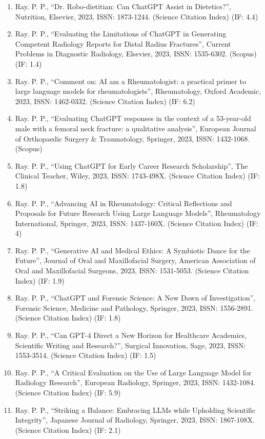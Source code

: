 \documentclass[11pt,a4paper]{moderncv}
\begin{document}
\begin{adjustwidth}{6em}{0pt}
\begin{enumerate}
		\item Ray. P. P., “Dr. Robo-dietitian: Can ChatGPT Assist in Dietetics?”, Nutrition, Elsevier, 2023, ISSN: 1873-1244. (Science Citation Index) (IF: 4.4)
		\item Ray. P. P., “Evaluating the Limitations of ChatGPT in Generating Competent Radiology Reports for Distal Radius Fractures”, Current Problems in Diagnostic Radiology, Elsevier, 2023, ISSN: 1535-6302. (Scopus) (IF: 1.4)
		\item Ray. P. P., “Comment on: AI am a Rheumatologist: a practical primer to large language models for rheumatologists”, Rheumatology, Oxford Academic, 2023, ISSN: 1462-0332. (Science Citation Index) (IF: 6.2)
		\item Ray. P. P., “Evaluating ChatGPT responses in the context of a 53-year-old male with a femoral neck fracture: a qualitative analysis”, European Journal of Orthopaedic Surgery \& Traumatology, Springer, 2023, ISSN: 1432-1068. (Scopus)
		\item Ray. P. P., “Using ChatGPT for Early Career Research Scholarship”, The Clinical Teacher, Wiley, 2023, ISSN: 1743-498X. (Science Citation Index) (IF: 1.8)
		\item Ray. P. P., “Advancing AI in Rheumatology: Critical Reflections and Proposals for Future Research Using Large Language Models”, Rheumatology International, Springer, 2023, ISSN: 1437-160X. (Science Citation Index) (IF: 4)
		\item Ray. P. P., “Generative AI and Medical Ethics: A Symbiotic Dance for the Future”, Journal of Oral and Maxillofacial Surgery, American Association of Oral and Maxillofacial Surgeons, 2023, ISSN: 1531-5053. (Science Citation Index) (IF: 1.9)
		\item Ray. P. P., “ChatGPT and Forensic Science: A New Dawn of Investigation”, Forensic Science, Medicine and Pathology, Springer, 2023, ISSN: 1556-2891. (Science Citation Index) (IF: 1.8)
		\item Ray. P. P., “Can GPT-4 Direct a New Horizon for Healthcare Academics, Scientific Writing and Research?”, Surgical Innovation, Sage, 2023, ISSN: 1553-3514. (Science Citation Index) (IF: 1.5)
		\item Ray. P. P., “A Critical Evaluation on the Use of Large Language Model for Radiology Research”, European Radiology, Springer, 2023, ISSN: 1432-1084. (Science Citation Index) (IF: 5.9)
		\item Ray. P. P., “Striking a Balance: Embracing LLMs while Upholding Scientific Integrity”, Japanese Journal of Radiology, Springer, 2023, ISSN: 1867-108X. (Science Citation Index) (IF: 2.1)
		

\end{enumerate}
\end{adjustwidth}
\end{document}
